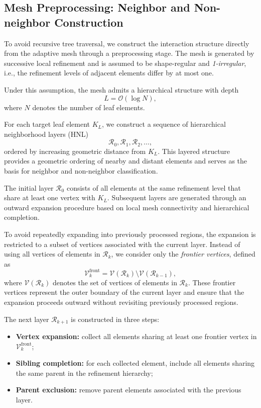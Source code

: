 \documentclass[a4paper,10pt]{article}
\begin{document}
\subsection{Mesh Preprocessing: Neighbor and Non-neighbor Construction}

To avoid recursive tree traversal, we construct the interaction
structure directly from the adaptive mesh through a preprocessing stage.
The mesh is generated by successive local refinement and is assumed to
be shape-regular and \emph{1-irregular}, i.e., the refinement levels of
adjacent elements differ by at most one.

Under this assumption, the mesh admits a hierarchical structure with depth
\[
L = \mathcal{O}(\log N),
\]
where $N$ denotes the number of leaf elements.

For each target leaf element $K_L$, we construct a sequence of
hierarchical neighborhood layers (HNL)
\[
\mathcal{R}_0, \mathcal{R}_1, \mathcal{R}_2, \dots,
\]
ordered by increasing geometric distance from $K_L$.
This layered structure provides a geometric ordering of nearby and distant
elements and serves as the basis for neighbor and non-neighbor
classification.

The initial layer $\mathcal{R}_0$ consists of all elements at the same
refinement level that share at least one vertex with $K_L$.
Subsequent layers are generated through an outward expansion procedure
based on local mesh connectivity and hierarchical completion.

To avoid repeatedly expanding into previously processed regions,
the expansion is restricted to a subset of vertices associated with the
current layer. Instead of using all vertices of elements in
$\mathcal{R}_k$, we consider only the \emph{frontier vertices},
defined as
\[
\mathcal{V}_k^{\mathrm{front}}
=
\mathcal{V}(\mathcal{R}_k)
\setminus
\mathcal{V}(\mathcal{R}_{k-1}),
\]
where $\mathcal{V}(\mathcal{R}_k)$ denotes the set of vertices of
elements in $\mathcal{R}_k$.
These frontier vertices represent the outer boundary of the current
layer and ensure that the expansion proceeds outward without revisiting
previously processed regions.

The next layer $\mathcal{R}_{k+1}$ is constructed in three steps:

\begin{itemize}
    \item \textbf{Vertex expansion:}
    collect all elements sharing at least one frontier vertex in
    $\mathcal{V}_k^{\mathrm{front}}$;

    \item \textbf{Sibling completion:}
    for each collected element, include all elements sharing the same
    parent in the refinement hierarchy;

    \item \textbf{Parent exclusion:}
    remove parent elements associated with the previous layer.
\end{itemize}
\end{document}
